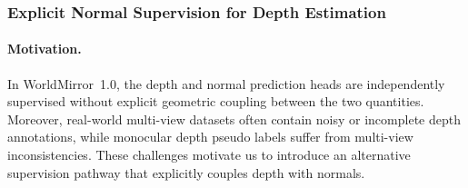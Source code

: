 \documentclass{article} %
\begin{document}
\subsubsection{Explicit Normal Supervision for Depth Estimation}
\label{sec:depth2normal}

\paragraph{Motivation.}
In WorldMirror~1.0, the depth and normal prediction heads are independently supervised without explicit geometric coupling between the two quantities. Moreover, real-world multi-view datasets often contain noisy or incomplete depth annotations, while monocular depth pseudo labels suffer from multi-view inconsistencies. These challenges motivate us to introduce an alternative supervision pathway that explicitly couples depth with normals.
\end{document}

